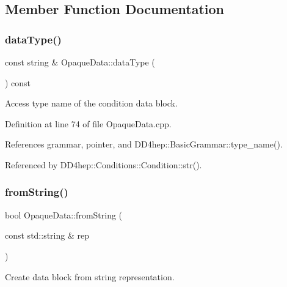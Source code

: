 \subsection{Member Function Documentation}
\hypertarget{class_d_d4hep_1_1_opaque_data_a89ff4579a7f7912ee3fc8087a47e2411}{}\label{class_d_d4hep_1_1_opaque_data_a89ff4579a7f7912ee3fc8087a47e2411} 
\subsubsection{\texorpdfstring{data\+Type()}{dataType()}}
{\footnotesize\ttfamily const string \& Opaque\+Data\+::data\+Type (\begin{DoxyParamCaption}{ }\end{DoxyParamCaption}) const}



Access type name of the condition data block. 



Definition at line 74 of file Opaque\+Data.\+cpp.



References grammar, pointer, and D\+D4hep\+::\+Basic\+Grammar\+::type\+\_\+name().



Referenced by D\+D4hep\+::\+Conditions\+::\+Condition\+::str().

\hypertarget{class_d_d4hep_1_1_opaque_data_a16fd37f0268885057b59d475031993c4}{}\label{class_d_d4hep_1_1_opaque_data_a16fd37f0268885057b59d475031993c4} 
\subsubsection{\texorpdfstring{from\+String()}{fromString()}}
{\footnotesize\ttfamily bool Opaque\+Data\+::from\+String (\begin{DoxyParamCaption}\item[{const std\+::string \&}]{rep }\end{DoxyParamCaption})}



Create data block from string representation. 



